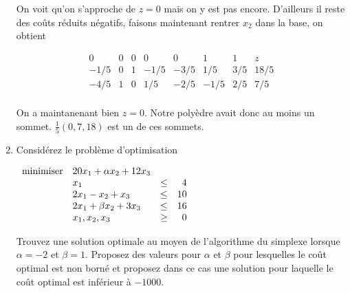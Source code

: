 \begin{enumerate}
\begin{solution}
      On voit qu'on s'approche de $z = 0$ mais on y est pas encore.
      D'ailleurs il reste des coûts réduits négatifs, faisons maintenant
      rentrer $x_2$ dans la base, on obtient

      \[
        \begin{array}{ccccccc|l}
           0   &  0   &  0 &  0   &  0   &  1   & 1   & z\\
          \hline
          -1/5 &  0   &  1 & -1/5 & -3/5 &  1/5 & 3/5 & 18/5\\
          -4/5 &  1   &  0 &  1/5 & -2/5 & -1/5 & 2/5 &  7/5\\
        \end{array}
      \]

      On a maintanenant bien $z = 0$.
      Notre polyèdre avait donc au moins un sommet.
      $\frac{1}{5}(0,7,18)$ est un de ces sommets.
    \end{solution}

  \item  Considérez le problème d'optimisation

    $
    \begin{array}{llcr}
      \mbox{minimiser} & 20 x_1+\alpha x_2+12 x_3\\
      & x_1  & \leq & 4\\
      &2x_1 - x_2+x_3 & \leq & 10\\
      &2x_1+\beta x_2+ 3x_3 & \leq & 16\\
      & x_1, x_2, x_3 & \geq & 0
    \end{array}
    $

    Trouvez une solution optimale au moyen de l'algorithme du simplexe
    lorsque $\alpha = -2$ et $\beta = 1$.
    Proposez des valeurs pour $\alpha$ et $\beta$ pour lesquelles
    le coût optimal est non borné et
    proposez dans ce cas une solution pour laquelle le coût
    optimal est inférieur à $-1000$.


\end{enumerate}
